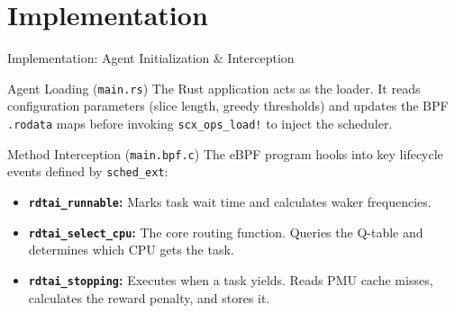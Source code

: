 \documentclass[aspectratio=169]{beamer}
\begin{document}
\section{Implementation}

\begin{frame}{Implementation: Agent Initialization \& Interception}
    \begin{block}{Agent Loading (\texttt{main.rs})}
        \small
        The Rust application acts as the loader. It reads configuration parameters (slice length, greedy thresholds) and updates the BPF \texttt{.rodata} maps before invoking \texttt{scx\_ops\_load!} to inject the scheduler.
    \end{block}

    \vspace{0.3cm}

    \begin{block}{Method Interception (\texttt{main.bpf.c})}
        \small
        The eBPF program hooks into key lifecycle events defined by \texttt{sched\_ext}:
        \begin{itemize}
            \item \textbf{\texttt{rdtai\_runnable}:} Marks task wait time and calculates waker frequencies.
            \item \textbf{\texttt{rdtai\_select\_cpu}:} The core routing function. Queries the Q-table and determines which CPU gets the task.
            \item \textbf{\texttt{rdtai\_stopping}:} Executes when a task yields. Reads PMU cache misses, calculates the reward penalty, and stores it.
        \end{itemize}
    \end{block}
\end{frame}
\end{document}
